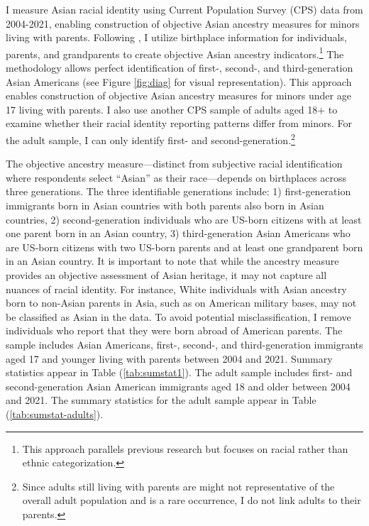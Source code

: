 I measure Asian racial identity using Current Population Survey (CPS) data from 2004-2021, enabling construction of objective Asian ancestry measures for minors living with parents. Following \textcite{antmanEthnicAttritionObserved2016,antmanEthnicAttritionAssimilation2020}, I utilize birthplace information for individuals, parents, and grandparents to create objective Asian ancestry indicators.\footnote{This approach parallels previous research but focuses on racial rather than ethnic categorization.} The methodology allows perfect identification of first-, second-, and third-generation Asian Americans (see Figure \ref{fig:diag} for visual representation). This approach enables construction of objective Asian ancestry measures for minors under age 17 living with parents. I also use another CPS sample of adults aged 18+ to examine whether their racial identity reporting patterns differ from minors. For the adult sample, I can only identify first- and second-generation.\footnote{Since adults still living with parents are might not representative of the overall adult population and is a rare occurrence, I do not link adults to their parents.}

The objective ancestry measure—distinct from subjective racial identification where respondents select ``Asian'' as their race—depends on birthplaces across three generations. The three identifiable generations include: 1) first-generation immigrants born in Asian countries with both parents also born in Asian countries, 2) second-generation individuals who are US-born citizens with at least one parent born in an Asian country, 3) third-generation Asian Americans who are US-born citizens with two US-born parents and at least one grandparent born in an Asian country. It is important to note that while the ancestry measure provides an objective assessment of Asian heritage, it may not capture all nuances of racial identity. For instance, White individuals with Asian ancestry born to non-Asian parents in Asia, such as on American military bases, may not be classified as Asian in the data. To avoid potential misclassification, I remove individuals who report that they were born abroad of American parents. The sample includes Asian Americans, first-, second-, and third-generation immigrants aged 17 and younger living with parents between 2004 and 2021. Summary statistics appear in Table (\ref{tab:sumstat1}). The adult sample includes first- and second-generation Asian American immigrants aged 18 and older between 2004 and 2021. The summary statistics for the adult sample appear in Table (\ref{tab:sumstat-adults}). 

